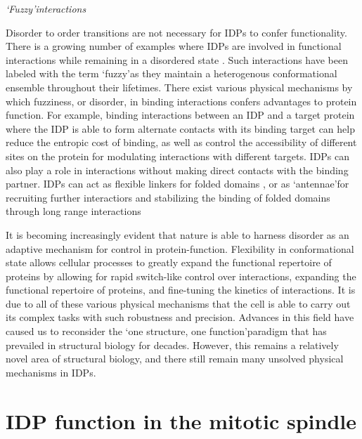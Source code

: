 \pagebreak

{\it \lq Fuzzy\rq interactions}

\par Disorder to order transitions are not necessary for IDPs to confer functionality. There is a growing number of examples where IDPs are involved in functional interactions while remaining in a disordered state \cite{tompa2008fuzzy}. Such interactions have been labeled with the term \lq fuzzy\rq as they maintain a heterogenous conformational ensemble throughout their lifetimes. There exist various physical mechanisms by which fuzziness, or disorder, in binding interactions confers advantages to protein function. For example, binding interactions between an IDP and a target protein where the IDP is able to form alternate contacts with its binding target can help reduce the entropic cost of binding, as well as control the accessibility of different sites on the protein for modulating interactions with different targets. \cite{graham2001tcf4, fontes2000structural} IDPs can also play a role in interactions without making direct contacts with the binding partner.  IDPs can act as flexible linkers for folded domains \cite{bhattacharyya2006ste5}, or as \lq antennae\rq for \cite{sigalov2004homooligomerization} recruiting further interactiors and stabilizing the binding of folded domains through long range interactions \cite{zor2002roles, yu1994structural} 

It is becoming increasingly evident that nature is able to harness disorder as an adaptive mechanism for control in protein-function. Flexibility in conformational state allows cellular processes to greatly expand the functional repertoire of proteins by allowing for rapid switch-like control over interactions, expanding the functional repertoire of proteins, and fine-tuning the kinetics of interactions.  It is due to all of these various physical mechanisms that the cell is able to carry out its complex tasks with such robustness and precision. Advances in this field have caused us to reconsider the  \lq one structure, one function\rq paradigm that has prevailed in structural biology for decades. However, this remains a relatively novel area of structural biology, and there still remain many unsolved physical mechanisms in IDPs.

\section{IDP function in the mitotic spindle}
 
